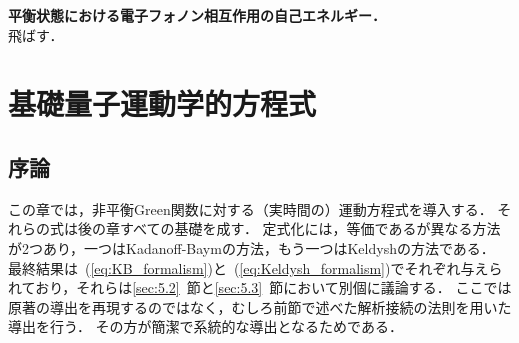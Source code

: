 \documentclass[a4paper,10pt]{jsarticle}
\begin{document}
\textbf{平衡状態における電子フォノン相互作用の自己エネルギー．}\\
飛ばす．


\section{基礎量子運動学的方程式}
\subsection{\label{sec:5.1}序論}
この章では，非平衡Green関数に対する（実時間の）運動方程式を導入する．
それらの式は後の章すべての基礎を成す．
定式化には，等価であるが異なる方法が2つあり，一つはKadanoff-Baymの方法，もう一つはKeldyshの方法である．
最終結果は~(\ref{eq:KB_formalism})と~(\ref{eq:Keldysh_formalism})でそれぞれ与えられており，それらは\ref{sec:5.2}~節と\ref{sec:5.3}~節において別個に議論する．
ここでは原著の導出を再現するのではなく，むしろ前節で述べた解析接続の法則を用いた導出を行う．
その方が簡潔で系統的な導出となるためである．

\end{document}
